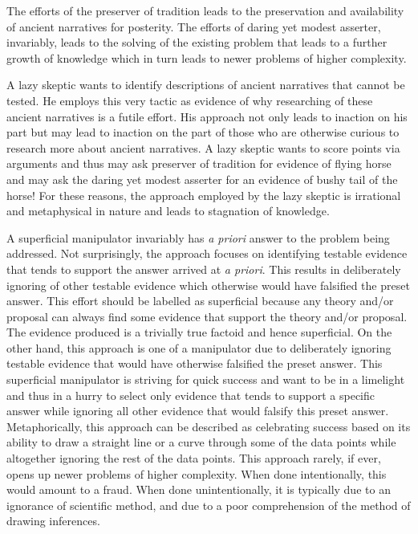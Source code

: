 The efforts of the preserver of tradition leads to the preservation and availability of ancient narratives for posterity. The efforts of daring yet modest asserter, invariably, leads to the solving of the existing problem that leads to a further growth of knowledge which in turn leads to newer problems of higher complexity.

A lazy skeptic wants to identify descriptions of ancient narratives that cannot be tested. He employs this very tactic as evidence of why researching of these ancient narratives is a futile effort. His approach not only leads to inaction on his part but may lead to inaction on the part of those who are otherwise curious to research more about ancient narratives. A lazy skeptic wants to score points via arguments and thus may ask preserver of tradition for evidence of flying horse and may ask the daring yet modest asserter for an evidence of bushy tail of the horse! For these reasons, the approach employed by the lazy skeptic is irrational and metaphysical in nature and leads to stagnation of knowledge.

A superficial manipulator invariably has \textit{a priori} answer to the problem being addressed. Not surprisingly, the approach focuses on identifying testable evidence that tends to support the answer arrived at \textit{a priori}. This results in deliberately ignoring of other testable evidence which otherwise would have falsified the preset answer. This effort should be labelled as superficial because any theory and/or proposal can always find some evidence that support the theory and/or proposal. The evidence produced is a trivially true factoid and hence superficial. On the other hand, this approach is one of a manipulator due to deliberately ignoring testable evidence that would have otherwise falsified the preset answer. This superficial manipulator is striving for quick success and want to be in a limelight and thus in a hurry to select only evidence that tends to support a specific answer while ignoring all other evidence that would falsify this preset answer. Metaphorically, this approach can be described as celebrating success based on its ability to draw a straight line or a curve through some of the data points while altogether ignoring the rest of the data points. This approach rarely, if ever, opens up newer problems of higher complexity. When done intentionally, this would amount to a fraud. When done unintentionally, it is typically due to an ignorance of scientific method, and due to a poor comprehension of the method of drawing inferences.

